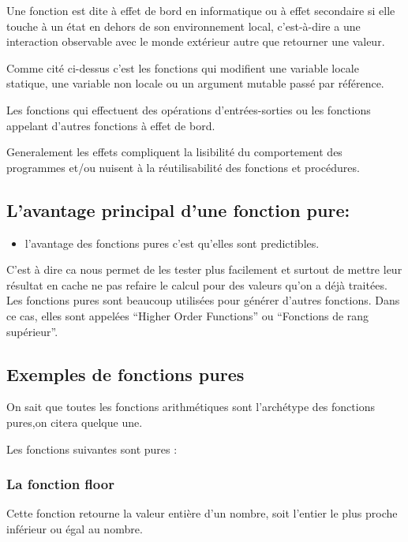 \documentclass[12pt,titlepage]{article}
\begin{document}
Une fonction est dite à effet de bord en informatique ou à effet secondaire si elle touche à un état en dehors de son environnement local, c'est-à-dire a une interaction observable avec le monde extérieur autre que retourner une valeur.

Comme cité ci-dessus c'est les fonctions qui modifient une variable locale statique, une variable non locale ou un argument mutable passé par référence.

Les fonctions qui effectuent des opérations d'entrées-sorties ou les fonctions appelant d'autres fonctions à effet de bord.

Generalement les effets compliquent la lisibilité du comportement des programmes et/ou nuisent à la réutilisabilité des fonctions et procédures.\cite{effetdebord}

\subsection{L’avantage principal d'une fonction pure:}

\begin{itemize}
	\item l'avantage des fonctions pures c'est qu'elles sont predictibles.
\end{itemize}

C'est à dire ca nous permet de les tester plus facilement et surtout de mettre leur résultat en cache ne pas refaire le calcul pour des valeurs qu’on a déjà traitées.
Les fonctions pures sont beaucoup utilisées pour générer d’autres fonctions. Dans ce cas, elles sont appelées “Higher Order Functions” ou “Fonctions de rang supérieur”.\cite{avantage}

\subsection{Exemples de fonctions pures }

On sait que toutes les fonctions arithmétiques sont l'archétype des fonctions pures,on citera quelque une.\cite{exemplefctpure}

Les fonctions  suivantes sont pures :


\subsubsection{La fonction floor}

Cette fonction retourne la valeur entière d'un nombre, soit l'entier le plus proche inférieur ou égal au nombre.
\end{document}

